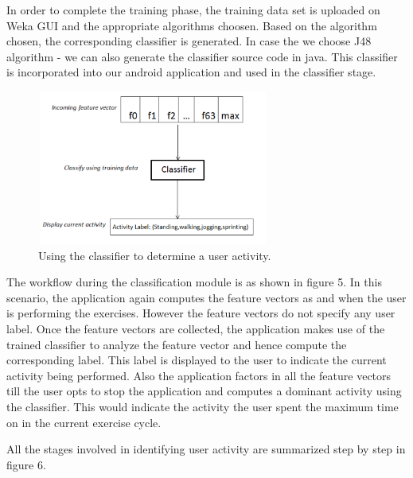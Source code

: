 \documentclass[conference]{IEEEtran}
\begin{document}
In order to complete the training phase, the training data set is uploaded on Weka GUI and the appropriate algorithms choosen. Based on the algorithm chosen, the corresponding classifier is generated. In case the we choose J48 algorithm - we can also generate the classifier source code in java. This classifier is incorporated into our android application and used in the classifier stage.

\begin{figure}
\centering
  \includegraphics[width=3in,height= 2in]{feature_vector_to_activity.pdf}
  \caption{Using the classifier to determine a user activity.}
\end{figure}
The workflow during the classification module is as shown in figure 5. In this scenario, the application again computes the feature vectors as and when the user is performing the exercises. However the feature vectors do not specify any user label. Once the feature vectors are collected, the application makes use of the trained classifier to analyze the feature vector and hence compute the corresponding label. This label is displayed to the user to indicate the current activity being performed. Also the application factors in all the feature vectors till the user opts to stop the application and computes a dominant activity using the classifier. This would indicate the activity the user spent the maximum time on in the current exercise cycle.

All the stages involved in identifying user activity are summarized step by step in figure 6.
\end{document}
